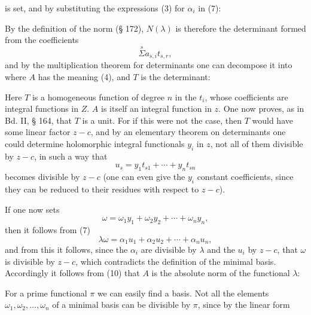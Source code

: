 is set, and by substituting the expressions (3) for $\alpha_i$ in (7):

By the definition of the norm (§ 172), $N(\lambda)$ is therefore the
determinant formed from the coefficients
\[
\overset{s}{\Sigma} a_{s,i} t_{s,r},
\]
and by the multiplication theorem for determinants one can decompose
 it into
where $A$ has the meaning (4), and $T$ is the determinant:

Here $T$ is a homogeneous function of degree $n$ in the $t_i$,
whose coefficients are integral functions in $Z$. $A$ is itself
an integral function in $z$. One now proves, as in Bd. II, § 164,
that $T$ is a unit. For if this were not the case, then
$T$ would have some linear factor $z - c$, and by an elementary
theorem on determinants one could determine holomorphic integral
functionals $y_i$ in $z$, not all of them divisible by $z - c$, in
such a way that
\[
u_s = y_1 t_{s1} + \cdots + y_n t_{sn}
\]
becomes divisible by $z - c$ (one can even give the $y_i$ constant
coefficients, since they can be reduced to their residues with respect
 to $z - c$).

If one now sets
\[
\omega = \omega_1 y_1 + \omega_2 y_2 + \cdots + \omega_n y_n,
\]
then it follows from (7)
\[
\lambda \omega = \alpha_1 u_1 + \alpha_2 u_2 + \cdots + \alpha_n u_n,
\]
and from this it follows, since the $\alpha_i$ are divisible by $\lambda$ and the $u_i$ by $z - c$,
that $\omega$ is divisible by $z - c$, which contradicts the definition of the
minimal basis. Accordingly it follows from (10) that $A$
is the absolute norm of the functional $\lambda$:

For a prime functional $\pi$ we can easily find a basis.
Not all the elements $\omega_1, \omega_2, \ldots, \omega_n$ of a minimal basis
can be divisible by $\pi$, since by the linear form
